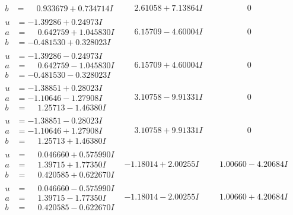 \documentclass[1p]{elsarticle_modified}
\theoremstyle{definition}
\begin{document}
$$\begin{array}{c|c|c}
\begin{aligned}
b &= \phantom{-}0.933679 + 0.734714 I\end{aligned}
 & \phantom{-}2.61058 + 7.13864 I & \phantom{-0.000000 } 0 \\ \hline\begin{aligned}
u &= -1.39286 + 0.24973 I \\
a &= \phantom{-}0.642759 + 1.045830 I \\
b &= -0.481530 + 0.328023 I\end{aligned}
 & \phantom{-}6.15709 - 4.60004 I & \phantom{-0.000000 } 0 \\ \hline\begin{aligned}
u &= -1.39286 - 0.24973 I \\
a &= \phantom{-}0.642759 - 1.045830 I \\
b &= -0.481530 - 0.328023 I\end{aligned}
 & \phantom{-}6.15709 + 4.60004 I & \phantom{-0.000000 } 0 \\ \hline\begin{aligned}
u &= -1.38851 + 0.28023 I \\
a &= -1.10646 - 1.27908 I \\
b &= \phantom{-}1.25713 - 1.46380 I\end{aligned}
 & \phantom{-}3.10758 - 9.91331 I & \phantom{-0.000000 } 0 \\ \hline\begin{aligned}
u &= -1.38851 - 0.28023 I \\
a &= -1.10646 + 1.27908 I \\
b &= \phantom{-}1.25713 + 1.46380 I\end{aligned}
 & \phantom{-}3.10758 + 9.91331 I & \phantom{-0.000000 } 0 \\ \hline\begin{aligned}
u &= \phantom{-}0.046660 + 0.575990 I \\
a &= \phantom{-}1.39715 + 1.77350 I \\
b &= \phantom{-}0.420585 + 0.622670 I\end{aligned}
 & -1.18014 + 2.00255 I & \phantom{-}1.00660 - 4.20684 I \\ \hline\begin{aligned}
u &= \phantom{-}0.046660 - 0.575990 I \\
a &= \phantom{-}1.39715 - 1.77350 I \\
b &= \phantom{-}0.420585 - 0.622670 I\end{aligned}
 & -1.18014 - 2.00255 I & \phantom{-}1.00660 + 4.20684 I \\ \hline\begin{aligned}

\end{aligned}
\end{array}$$
\end{document}
